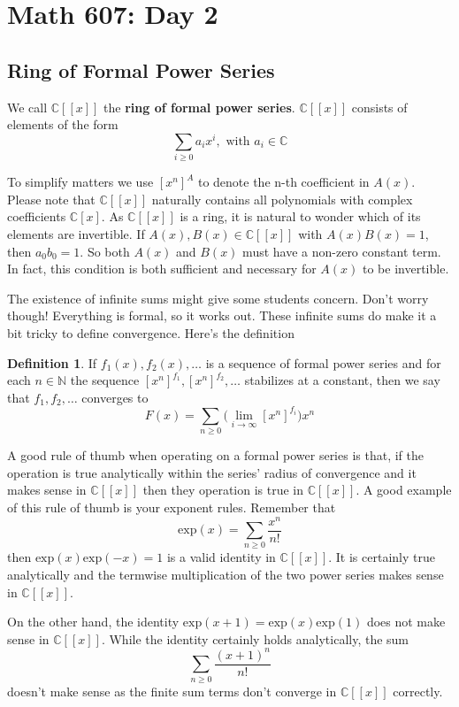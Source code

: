 \documentclass{article}
\theoremstyle{definition}
\newtheorem{definition}{Definition}
\begin{document}
\section{Math 607: Day 2}
\subsection{Ring of Formal Power Series}
We call $\mathbb{C}[[x]]$ the \textbf{ring of formal power series}. $\mathbb{C}[[x]]$ consists of elements of the form 
\[\sum_{i\geq 0}a_ix^i, \text{ with } a_i \in \mathbb{C}\]

To simplify matters we use $[x^n]^A$ to denote the n-th coefficient in $A(x)$. Please note that $\mathbb{C}[[x]]$ naturally contains all polynomials with complex coefficients $\mathbb{C}[x]$. As $\mathbb{C}[[x]]$ is a ring, it is natural to wonder which of its elements are invertible. If $A(x), B(x) \in \mathbb{C}[[x]]$ with $A(x)B(x) = 1$, then $a_0b_0 = 1$. So both $A(x)$ and $B(x)$ must have a non-zero constant term. In fact, this condition is both sufficient and necessary for $A(x)$ to be invertible. 

The existence of infinite sums might give some students concern. Don't worry though! Everything is formal, so it works out. These infinite sums do make it a bit tricky to define convergence. Here's the definition

\begin{definition} If $f_1(x),f_2(x),\dots$ is a sequence of formal power series and for each $n \in \mathbb{N}$ the sequence $[x^n]^{f_1},[x^n]^{f_2},\dots$ stabilizes at a constant, then we say that $f_1,f_2,\dots$ converges to 
\[F(x) = \sum_{n\geq 0}{\Big(\lim_{i \rightarrow \infty}[x^n]^{f_i}\Big)x^n}\]
\end{definition} 

A good rule of thumb when operating on a formal power series is that, if the operation is true analytically within the series' radius of convergence and it makes sense in $\mathbb{C}[[x]]$ then they operation is true in $\mathbb{C}[[x]]$. A good example of this rule of thumb is your exponent rules. Remember that \[\text{exp}(x) = \sum_{n\geq 0}{\frac{x^n}{n!}}\]
then $\text{exp}(x)\text{exp}(-x) = 1$ is a valid identity in $\mathbb{C}[[x]]$. It is certainly true analytically and the termwise multiplication of the two power series makes sense in $\mathbb{C}[[x]]$. 

On the other hand, the identity $\text{exp}(x+1) = \text{exp}(x)\text{exp}(1)$ does not make sense in $\mathbb{C}[[x]]$. While the identity certainly holds analytically, the sum \[\sum_{n\geq 0}{\frac{(x+1)^n}{n!}}\] doesn't make sense as the finite sum terms don't converge in $\mathbb{C}[[x]]$ correctly. 
\end{document}

